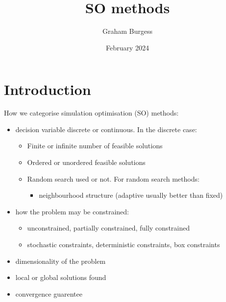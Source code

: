 \message{ !name(SO-Methods.tex)}\documentclass{article}
\title{SO methods}
\author{Graham Burgess}
\date{February 2024}
\begin{document}


\maketitle

\section{Introduction}

How we categorise simulation optimisation (SO) methods:

\begin{itemize}
  \item decision variable discrete or continuous. In the discrete case: 
  \begin{itemize}
    \item Finite or infinite number of feasible solutions
    \item Ordered or unordered feasible solutions
    \item Random search used or not. For random search methods:
    \begin{itemize}
      \item neighbourhood structure (adaptive usually better than fixed)
    \end{itemize}
  \end{itemize}
  \item how the problem may be constrained:
  \begin{itemize}
    \item unconstrained, partially constrained, fully constrained
    \item stochastic constraints, deterministic constraints, box constraints
  \end{itemize}
  \item dimensionality of the problem
  \item local or global solutions found
  \item convergence guarentee

\end{itemize}
\end{document}
